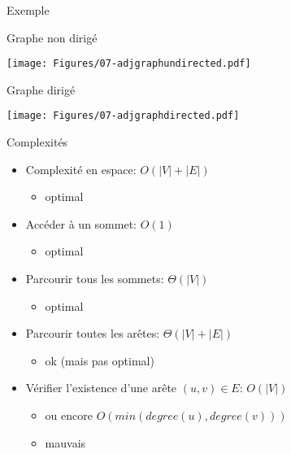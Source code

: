 \begin{frame}{Exemple}

Graphe non dirigé
\centerline{\texttt{[image: Figures/07-adjgraphundirected.pdf]}}

\bigskip

Graphe dirigé
\centerline{\texttt{[image: Figures/07-adjgraphdirected.pdf]}}

\end{frame}

\begin{frame}{Complexités}
\begin{itemize}
\item Complexité en espace: $O(|V|+|E|)$
\begin{itemize}
\item optimal
\end{itemize}
\item Accéder à un sommet: $O(1)$
\begin{itemize}
\item optimal
\end{itemize}
\item Parcourir tous les sommets: $\Theta(|V|)$
\begin{itemize}
\item optimal
\end{itemize}
\item Parcourir toutes les arêtes: $\Theta(|V|+|E|)$
\begin{itemize}
\item ok (mais pas optimal)
\end{itemize}
\item Vérifier l'existence d'une arête $(u,v)\in E$: $O(|V|)$
\begin{itemize}
\item ou encore $O(min(degree(u),degree(v)))$
\item mauvais
\end{itemize}
\end{itemize}
\end{frame}

